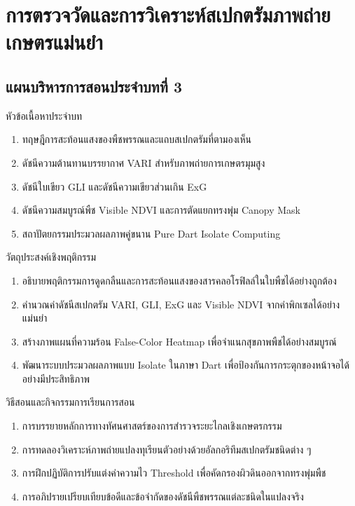 \chapter{การตรวจวัดและการวิเคราะห์สเปกตรัมภาพถ่ายเกษตรแม่นยำ}
\label{chap:ch03}

\section*{แผนบริหารการสอนประจำบทที่ 3}

\begin{planbox}{หัวข้อเนื้อหาประจำบท}
\begin{enumerate}
    \item ทฤษฎีการสะท้อนแสงของพืชพรรณและแถบสเปกตรัมที่ตามองเห็น
    \item ดัชนีความต้านทานบรรยากาศ VARI สำหรับภาพถ่ายการเกษตรมุมสูง
    \item ดัชนีใบเขียว GLI และดัชนีความเขียวส่วนเกิน ExG
    \item ดัชนีความสมบูรณ์พืช Visible NDVI และการตัดแยกทรงพุ่ม Canopy Mask
    \item สถาปัตยกรรมประมวลผลภาพคู่ขนาน Pure Dart Isolate Computing
\end{enumerate}
\end{planbox}

\begin{planbox}{วัตถุประสงค์เชิงพฤติกรรม}
\begin{enumerate}
    \item อธิบายพฤติกรรมการดูดกลืนและการสะท้อนแสงของสารคลอโรฟิลล์ในใบพืชได้อย่างถูกต้อง
    \item คำนวณค่าดัชนีสเปกตรัม VARI, GLI, ExG และ Visible NDVI จากค่าพิกเซลได้อย่างแม่นยำ
    \item สร้างภาพแผนที่ความร้อน False-Color Heatmap เพื่อจำแนกสุขภาพพืชได้อย่างสมบูรณ์
    \item พัฒนาระบบประมวลผลภาพแบบ Isolate ในภาษา Dart เพื่อป้องกันการกระตุกของหน้าจอได้อย่างมีประสิทธิภาพ
\end{enumerate}
\end{planbox}

\newpage

\begin{planbox}{วิธีสอนและกิจกรรมการเรียนการสอน}
\begin{enumerate}
    \item การบรรยายหลักการทางทัศนศาสตร์ของการสำรวจระยะไกลเชิงเกษตรกรรม
    \item การทดลองวิเคราะห์ภาพถ่ายแปลงทุเรียนตัวอย่างด้วยอัลกอริทึมสเปกตรัมชนิดต่าง ๆ
    \item การฝึกปฏิบัติการปรับแต่งค่าความไว Threshold เพื่อคัดกรองผิวดินออกจากทรงพุ่มพืช
    \item การอภิปรายเปรียบเทียบข้อดีและข้อจำกัดของดัชนีพืชพรรณแต่ละชนิดในแปลงจริง
\end{enumerate}
\end{planbox}

